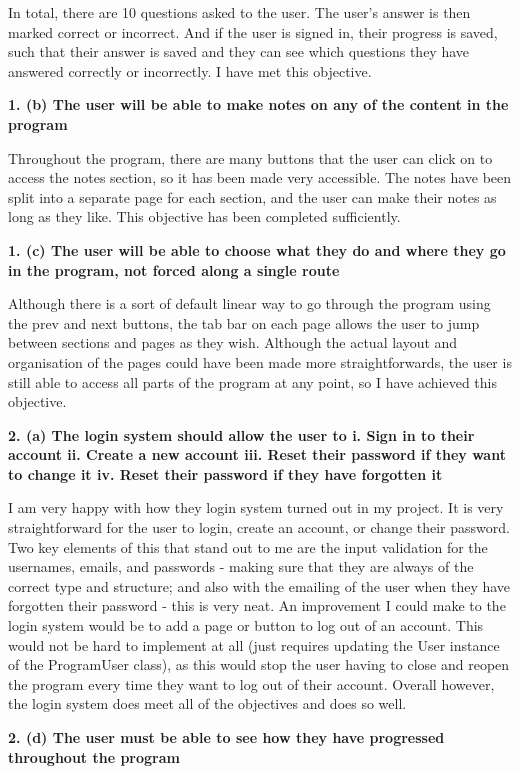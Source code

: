 \documentclass{article}
\begin{document}
In total, there are 10 questions asked to the user. The user's answer is then marked correct or incorrect. And if the user is signed in, their progress is saved, such that their answer is saved and they can see which questions they have answered correctly or incorrectly. I have met this objective.


\textbf{1. (b) The user will be able to make notes on any of the content in the program}

Throughout the program, there are many buttons that the user can click on to access the notes section, so it has been made very accessible. The notes have been split into a separate page for each section, and the user can make their notes as long as they like. This objective has been completed sufficiently.


\textbf{1. (c) The user will be able to choose what they do and where they go in the program, not forced along a single route}

Although there is a sort of default linear way to go through the program using the prev and next buttons, the tab bar on each page allows the user to jump between sections and pages as they wish. Although the actual layout and organisation of the pages could have been made more straightforwards, the user is still able to access all parts of the program at any point, so I have achieved this objective.

\textbf{2. (a) The login system should allow the user to i. Sign in to their account ii. Create a new account iii. Reset their password if they want to change it iv. Reset their password if they have forgotten it}

I am very happy with how they login system turned out in my project. It is very straightforward for the user to login, create an account, or change their password. Two key elements of this that stand out to me are the input validation for the usernames, emails, and passwords - making sure that they are always of the correct type and structure; and also with the emailing of the user when they have forgotten their password - this is very neat. An improvement I could make to the login system would be to add a page or button to log out of an account. This would not be hard to implement at all (just requires updating the User instance of the ProgramUser class), as this would stop the user having to close and reopen the program every time they want to log out of their account. Overall however, the login system does meet all of the objectives and does so well.

\textbf{2. (d) The user must be able to see how they have progressed throughout the program}
\end{document}
